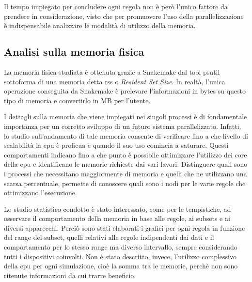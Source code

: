 Il tempo impiegato per concludere ogni regola non è però l'unico fattore da prendere in considerazione, visto che per promuovere l'uso della parallelizzazione è indispensabile analizzare le modalità di utilizzo della memoria. 

\subsection{Analisi sulla memoria fisica}
La memoria fisica studiata è ottenuta grazie a Snakemake dal tool psutil sottoforma di una memoria detta rss o \textit{Resident Set Size}. 
In realtà, l'unica operazione conseguita da Snakemake è prelevare l'informazioni in bytes su questo tipo di memoria e convertirlo in MB per l'utente.

I dettagli sulla memoria che viene impiegati nei singoli processi è di fondamentale importanza per un corretto sviluppo di un futuro sistema parallelizzato.
Infatti, lo studio sull'andamento di tale memoria consente di verificare fino a che livello di scalabilità la cpu è proficua e quando il suo uso comincia a saturare.
Questi comportamenti indicano fino a che punto è possibile ottimizzare l'utilizzo dei core della cpu e identificano le memorie richieste dai vari lavori.
Distinguere quali sono i processi che necessitano maggiormente di memoria e quelli che ne utilizzano una scarsa percentuale, permette di conoscere quali sono i nodi per le varie regole che ottimizzano l'esecuzione.

Lo studio statistico condotto è stato interessato, come per le tempistiche, ad osservare il comportamento della memoria in base alle regole, ai subsets e ai diversi apparecchi.
Perciò sono stati elaborati i grafici per ogni regola in funzione del range del subset, quelli relativi alle regole indipendenti dai dati e il comportamento per lo stesso range ma diverso intervallo, sempre considerando tutti i dispositivi coinvolti.
Non è stato descritto, invece, l'utilizzo complessivo della cpu per ogni simulazione, cioè la somma tra le memorie, perchè non sono ritenute informazioni da cui trarre beneficio. 
    

